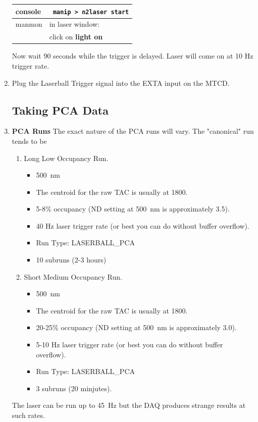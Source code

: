 \documentclass[11pt]{article}
\begin{document}
\begin{enumerate}
\begin{center}
\begin{tabular}{|l|l|}
\hline
console & \verb+ manip > n2laser start+ \\
\hline
manmon & in laser window: \\
& click on {\bf light on} \\
\hline
\end{tabular}
\end{center}
Now wait 90 seconds while the trigger is delayed. Laser will come on at 10 Hz trigger rate.
\item  \CheckBox[name=rlup52]{} Plug the Laserball Trigger signal into the EXTA input on the MTCD.

\subsection{Taking PCA Data}
\item {\bf PCA Runs} The exact nature of the PCA runs will vary. The "canonical" run tends to be 
	\begin{enumerate}
	\item \CheckBox[name=PCA1]{} Long Low Occupancy Run.
		\begin{itemize}
		\item 500~nm
		\item The centroid for the raw TAC is usually at 1800.
		\item 5-8\% occupancy (ND setting at 500~nm is approximately 3.5).
		\item 40 Hz laser trigger rate (or best you can do without buffer overflow).
		\item Run Type: LASERBALL\_PCA
		\item 10 subruns (2-3 hours)
		\end{itemize}
	\item \CheckBox[name=PCA2]{} Short Medium Occupancy Run.
		\begin{itemize}
		\item 500~nm
		\item The centroid for the raw TAC is usually at 1800.
		\item 20-25\% occupancy (ND setting at 500~nm is approximately 3.0).
		\item 5-10 Hz laser trigger rate (or best you can do without buffer overflow).
		\item Run Type: LASERBALL\_PCA
		\item 3 subruns (20 minjutes).
		\end{itemize}
	\end{enumerate}
	The laser can be run up to 45~Hz but the DAQ produces strange results at such rates.

\end{enumerate}
\end{document}

